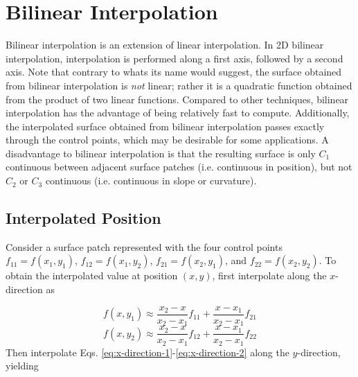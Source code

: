 \documentclass[
10pt, %
a4paper, %
oneside, %
headinclude,footinclude, %
BCOR5mm, %
]{scrartcl}
\begin{document}
\section{Bilinear Interpolation}
Bilinear interpolation is an extension of linear interpolation. In 2D bilinear interpolation, interpolation is performed along a first axis, followed by a second axis. Note that contrary to whats its name would suggest, the surface obtained from bilinear interpolation is \emph{not} linear; rather it is a quadratic function obtained from the product of two linear functions. Compared to other techniques, bilinear interpolation has the advantage of being relatively fast to compute. Additionally, the interpolated surface obtained from bilinear interpolation passes exactly through the control points, which may be desirable for some applications. A disadvantage to bilinear interpolation is that the resulting surface is only $C_1$ continuous between adjacent surface patches (i.e. continuous in position), but not $C_2$ or $C_3$ continuous (i.e. continuous in slope or curvature).

\subsection{Interpolated Position}
Consider a surface patch represented with the four control points $f_{11}=f(x_1,y_1)$, $f_{12}=f(x_1,y_2)$, $f_{21}=f(x_2,y_1)$, and $f_{22}=f(x_2,y_2)$. To obtain the interpolated value at position $(x,y)$, first interpolate along the $x$-direction as

\begin{equation}
f(x,y_1) \approx \frac{x_2 - x}{x_2 - x_1} f_{11} + \frac{x - x_1}{x_2 - x_1}f_{21}
\label{eq:x-direction-1}
\end{equation}
\begin{equation}
f(x,y_2) \approx \frac{x_2 - x}{x_2 - x_1} f_{12} + \frac{x - x_1}{x_2 - x_1}f_{22}
\label{eq:x-direction-2}
\end{equation}
Then interpolate Eqs. \eqref{eq:x-direction-1}-\eqref{eq:x-direction-2} along the $y$-direction, yielding
\end{document}
